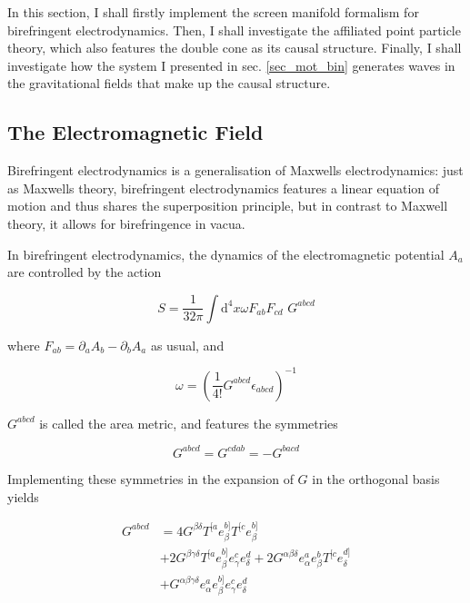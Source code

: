 \documentclass[11pt]{article}
\begin{document}
In this section, I shall firstly implement the screen manifold formalism for birefringent electrodynamics. Then, I shall investigate the affiliated point particle theory, which also features the double cone as its causal structure. Finally, I shall investigate how the system I presented in sec. \ref{sec_mot_bin} generates waves in the gravitational fields that make up the causal structure.

\subsection{The Electromagnetic Field} \label{sec_em_am}

Birefringent electrodynamics is a generalisation of Maxwells electrodynamics: just as Maxwells theory, birefringent electrodynamics features a linear equation of motion and thus shares the superposition principle, but in contrast to Maxwell theory, it allows for birefringence in vacua.

In birefringent electrodynamics, the dynamics of the electromagnetic potential $A_a$ are controlled by the action 

\begin{equation} \label{act_gled}
	S = \frac{1}{32 \pi} \int \mathrm{d}^4 x \omega F_{a b} F_{c d} \, \,
	G^{a b c d}
\end{equation}

where $F_{a b} = \partial_a A_b - \partial_b A_a $ as usual, and 

\begin{equation}
	\omega = \left( \frac{1}{4 !} G^{a b c d} \epsilon_{a b c d} \right)^{-1}
\end{equation}

 $G^{a b c d}$ is called the area metric, and features the symmetries

\begin{equation}
	G^{a b c d} = G^{c d a b} = - G^{b a c d}	
\end{equation}

Implementing these symmetries in the expansion of $G$ in the orthogonal basis yields 

\begin{equation}
	\begin{split}
		G^{a b c d} 
		&= 4 G^{\beta \delta} T^{[a} e_\beta^{b]} T^{[c} e_\beta^{b]}\\
		&+ 2 G^{\beta \gamma \delta} T^{[a} e_\beta^{b]} e_\gamma^{c} e_\delta^{d}
		+ 2 G^{\alpha \beta \delta} e_\alpha^a e_\beta^{b} T^{[c} e_\delta^{d]}\\
		&+ G^{\alpha \beta \gamma \delta} e_\alpha^a e_\beta^{b]} e_\gamma^{c} e_\delta^{d}
	\end{split}   
\end{equation}
\end{document}
